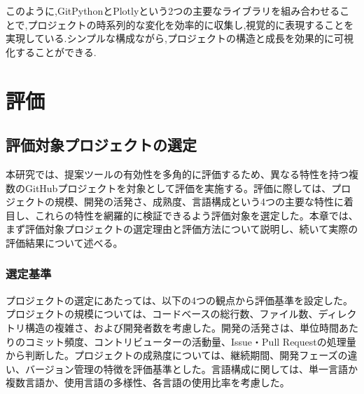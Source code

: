 \documentclass[12pt,twoside]{jbook}
\begin{document}
このように,GitPythonとPlotlyという2つの主要なライブラリを組み合わせることで,プロジェクトの時系列的な変化を効率的に収集し,視覚的に表現することを実現している.シンプルな構成ながら,プロジェクトの構造と成長を効果的に可視化することができる.

\chapter{評価}

\section{評価対象プロジェクトの選定}
本研究では、提案ツールの有効性を多角的に評価するため、異なる特性を持つ複数のGitHubプロジェクトを対象として評価を実施する。評価に際しては、プロジェクトの規模、開発の活発さ、成熟度、言語構成という4つの主要な特性に着目し、これらの特性を網羅的に検証できるよう評価対象を選定した。本章では、まず評価対象プロジェクトの選定理由と評価方法について説明し、続いて実際の評価結果について述べる。

\subsection{選定基準}
プロジェクトの選定にあたっては、以下の4つの観点から評価基準を設定した。プロジェクトの規模については、コードベースの総行数、ファイル数、ディレクトリ構造の複雑さ、および開発者数を考慮した。開発の活発さは、単位時間あたりのコミット頻度、コントリビューターの活動量、Issue・Pull Requestの処理量から判断した。プロジェクトの成熟度については、継続期間、開発フェーズの違い、バージョン管理の特徴を評価基準とした。言語構成に関しては、単一言語か複数言語か、使用言語の多様性、各言語の使用比率を考慮した。
\end{document}
